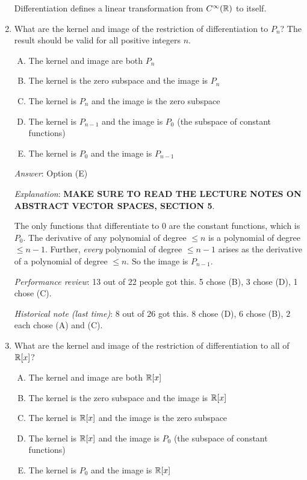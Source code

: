\documentclass[10pt]{amsart}
\begin{document}
\begin{enumerate}
  Differentiation defines a linear transformation from
  $C^\infty(\mathbb{R})$ to itself.

\item What are the kernel and image of the restriction of
  differentiation to $P_n$? The result should be valid for all
  positive integers $n$.
 
  \begin{enumerate}[(A)]
  \item The kernel and image are both $P_n$
  \item The kernel is the zero subspace and the image is $P_n$
  \item The kernel is $P_n$ and the image is the zero subspace
  \item The kernel is $P_{n-1}$ and the image is $P_0$ (the subspace
    of constant functions)
  \item The kernel is $P_0$ and the image is $P_{n-1}$
  \end{enumerate}
  
  {\em Answer}: Option (E)

  {\em Explanation}: {\bf MAKE SURE TO READ THE LECTURE NOTES ON
    ABSTRACT VECTOR SPACES, SECTION 5}.
  
  The only functions that differentiate to $0$ are
  the constant functions, which is $P_0$. The derivative of any
  polynomial of degree $\le n$ is a polynomial of degree $\le n -
  1$. Further, {\em every} polynomial of degree $\le n - 1$ arises as
  the derivative of a polynomial of degree $\le n$. So the image is
  $P_{n-1}$.

  {\em Performance review}: 13 out of 22 people got this. 5 chose (B),
  3 chose (D), 1 chose (C).

  {\em Historical note (last time)}: $8$ out of $26$ got this. $8$ chose (D),
  $6$ chose (B), $2$ each chose (A) and (C).

\item What are the kernel and image of the restriction of
  differentiation to all of $\mathbb{R}[x]$?

  \begin{enumerate}[(A)]
  \item The kernel and image are both $\mathbb{R}[x]$
  \item The kernel is the zero subspace and the image is $\mathbb{R}[x]$
  \item The kernel is $\mathbb{R}[x]$ and the image is the zero subspace
  \item The kernel is $\mathbb{R}[x]$ and the image is $P_0$ (the subspace
    of constant functions)
  \item The kernel is $P_0$ and the image is $\mathbb{R}[x]$
  \end{enumerate}


\end{enumerate}
\end{document}

